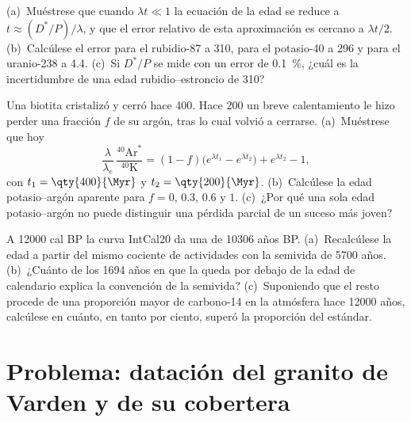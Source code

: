 \begin{exercise}[$\star\star\star$]\label{exo:b1:radiometric-methods:10}
(a)~Muéstrese que cuando $\lambda t \ll 1$ la ecuación de la edad se reduce a $t \approx
(D^*/P)/\lambda$, y que el error relativo de esta aproximación es cercano a
$\lambda t/2$. (b)~Calcúlese el error para el rubidio-87 a \qty{310}{\Ma}, para el potasio-40 a \qty{296}{\Ma} y para el uranio-238 a \qty{4.4}{\Ga}. (c)~Si $D^*/P$ se mide con un error de \qty{0.1}{\percent}, ¿cuál es la incertidumbre de una edad rubidio--estroncio de \qty{310}{\Ma}?
\end{exercise}

\begin{exercise}[$\star\star\star$]\label{exo:b1:radiometric-methods:11}
Una biotita cristalizó y cerró hace \qty{400}{\Myr}. Hace \qty{200}{\Myr} un breve calentamiento le hizo perder una fracción $f$ de su argón, tras lo cual volvió a cerrarse. (a)~Muéstrese que hoy
\[
  \frac{\lambda}{\lambda_e}\,\frac{^{40}\mathrm{Ar}^*}{^{40}\mathrm{K}} =
  (1 - f)\bigl(e^{\lambda t_1} - e^{\lambda t_2}\bigr) + e^{\lambda t_2} - 1,
\]
con $t_1 = \qty{400}{\Myr}$ y $t_2 = \qty{200}{\Myr}$. (b)~Calcúlese la edad potasio--argón aparente para $f = 0$, $0.3$, $0.6$ y $1$. (c)~¿Por qué una sola edad potasio--argón no puede distinguir una pérdida parcial de un suceso más joven?
\end{exercise}

\begin{exercise}[$\star\star\star$]\label{exo:b1:radiometric-methods:12}
A \num{12000} cal BP la curva IntCal20 da una  de \num{10306} años BP. (a)~Recalcúlese la edad a partir del mismo cociente de actividades con la semivida de \num{5700} años. (b)~¿Cuánto de los \num{1694} años en que la  queda por debajo de la edad de calendario explica la convención de la semivida? (c)~Suponiendo que el resto procede de una proporción mayor de carbono-14 en la atmósfera hace \num{12000} años, calcúlese en cuánto, en tanto por ciento, superó la proporción del estándar.
\end{exercise}

\section{Problema: datación del granito de Varden y de su cobertera}

